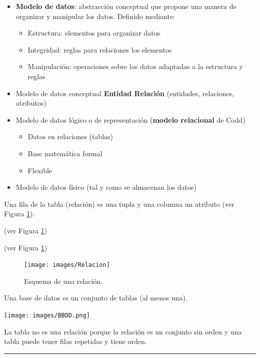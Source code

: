 \documentclass[]{book}
\providecommand{\tightlist}{%
  \setlength{\itemsep}{0pt}\setlength{\parskip}{0pt}}
\begin{document}
\begin{itemize}
\item
  \textbf{Modelo de datos}: abstracción conceptual que propone una manera de organizar y manipular los datos. Definido mediante:

  \begin{itemize}
  \tightlist
  \item
    Estructura: elementos para organizar datos
  \item
    Integridad: reglas para relaciones los elementos
  \item
    Manipulación: operaciones sobre los datos adaptadas a la estructura y reglas
  \end{itemize}
\item
  Modelo de datos conceptual \textbf{Entidad Relación} (entidades, relaciones, atributos)
\item
  Modelo de datos lógico o de representación (\textbf{modelo relacional} de Codd)

  \begin{itemize}
  \tightlist
  \item
    Datos en relaciones (tablas)
  \item
    Base matemática formal
  \item
    Flexible
  \end{itemize}
\item
  Modelo de datos físico (tal y como se almacenan los datos)
\end{itemize}

Una fila de la tabla (relación) es una tupla y una columna un atributo (ver Figura \ref{fig:relacion}).

(ver Figura \ref{fig:relacion})

(ver Figura \ref{fig:relacion})

\begin{figure}[!htb]

{\centering \texttt{[image: images/Relacion]} 

}

\caption{Esquema de una relación.}\label{fig:relacion}
\end{figure}

Una base de datos es un conjunto de tablas (al menos una).

\texttt{[image: images/BBDD.png]}

La tabla no es una relación porque la relación es un conjunto sin orden y una tabla puede tener filas repetidas y tiene orden.

\begin{center}\rule{0.5\linewidth}{\linethickness}\end{center}
\end{document}
